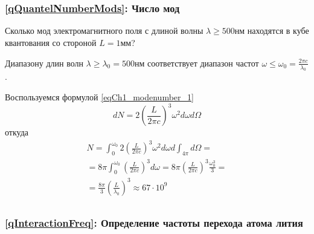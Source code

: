 \chapter{}

\section{} 

\subsection{\ref{qQuantelNumberMods}: Число мод}
Сколько мод электромагнитного поля с длиной волны
  $\lambda \ge 500 \mbox{нм}$ находятся в кубе квантования со стороной
$L=1 \mbox{мм}$?

Диапазону длин волн $\lambda \ge \lambda_0 = 500 \mbox{нм}$
соответствует диапазон частот
$\omega \le \omega_0 = \frac{2 \pi c}{\lambda_0}$.

Воспользуемся формулой \ref{eqCh1_modenumber_1}
\[
d N = 2 \left(\frac{L}{2 \pi c} \right)^3 \omega^2 d \omega d \Omega
\]
откуда
\begin{eqnarray}
  N = \int_0^{\omega_0} 2 \left(\frac{L}{2 \pi c} \right)^3 \omega^2 d
  \omega d \int_{4 \pi} d \Omega =
  \nonumber \\
  = 8 \pi \int_0^{\omega_0} \left(\frac{L}{2 \pi c} \right)^3 d \omega
  = 8 \pi \left(\frac{L}{2 \pi c}\right)^3 \frac{\omega_0^3}{3} =
  \nonumber \\
  = \frac{8 \pi}{3} \left(\frac{L}{\lambda_0}\right)^3 \approx 67
  \cdot 10^9
  \nonumber
\end{eqnarray}


\section{}

\subsection{\ref{qInteractionFreq}: Определение частоты перехода атома
лития} 


